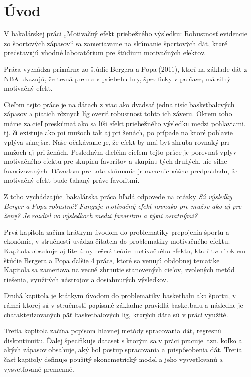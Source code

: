 \documentclass[
  digital, %
  oneside, %
  notable,   %
  lof,     %
  lot,     %
]{fithesis3}
\begin{document}
	\makeatletter
	\thesis@preamble %
	\makeatother
	
	\chapter*{Úvod}
	
	V bakalárskej práci „Motivačný efekt priebežného výsledku: Robustnosť evidencie zo športových zápasov“ sa zameriavame na skúmanie športových dát, ktoré predstavujú vhodné laboratórium pre štúdium motivačných efektov.
	
	Práca vychádza primárne zo štúdie Bergera a Popa (2011), ktorí na základe dát z NBA ukazujú, že tesná prehra v priebehu hry, špecificky v polčase, má silný motivačný efekt. 
	
	Cieľom tejto práce je na dátach z viac ako dvadsať jedna tisíc basketbalových zápasov a piatich rôznych líg overiť robustnosť tohto ich záveru. Okrem toho máme za cieľ preskúmať ako sa líši efekt priebežného výsledku medzi pohlaviami, tj. či existuje ako pri mužoch tak aj pri ženách, po prípade na ktoré pohlavie vplýva silnejšie. Naše očakávanie je, že efekt by mal byť zhruba rovnaký pri mužoch aj pri ženách. Posledným dielčim cieľom tejto práce je porovnať vplyv motivačného efektu pre skupinu favoritov a skupinu tých druhých, nie silne favorizovaných. Dôvodom pre toto skúmanie je overenie nášho predpokladu, že motivačný efekt bude ťahaný práve favoritmi.
	
	Z toho vychádzajúc, bakalárska práca hľadá odpovede na otázky \textit{Sú výsledky Berger a Popa robustné? Funguje motivačný efekt rovnako pre mužov ako aj pre ženy? Je rozdiel vo výsledkoch medzi favoritmi a tými ostatnými?} 
	
	Prvá kapitola začína krátkym úvodom do problematiky prepojenia športu a ekonómie, v stručnosti uvádza čitateľa do problematiky  motivačného efektu. Kapitola obsahuje aj literárny rešerš teórie motivačného efektu, ktorí tvorí okrem štúdie Bergera a Popa ďalšie 4 práce, ktoré sa venujú obdobnej tematike. Kapitola sa zameriava na vecné zhrnutie stanovených cieľov, zvolených metód riešenia, využitých nástrojov a dosiahnutých výsledkov. 
	
	Druhá kapitola je krátkym úvodom do problematiky basketbalu ako športu, v rámci ktorej sú v stručnosti popísané základné pravidlá basketbalu a následne je charakterizovaných päť basketbalových líg, ktorých dáta sú v práci využité.
	
	Tretia kapitola začína popisom hlavnej metódy spracovania dát, regresnú diskontinuitu. Ďalej špecifikuje dataset s ktorým sa v práci pracuje, tzn. koľko a akých zápasov obsahuje, aký bol postup spracovania a prispôsobenia dát. Tretia časť kapitoly definuje použitý ekonometrický model a jeho vysvetľovanú a vysvetľované premenné.
	
\end{document}
